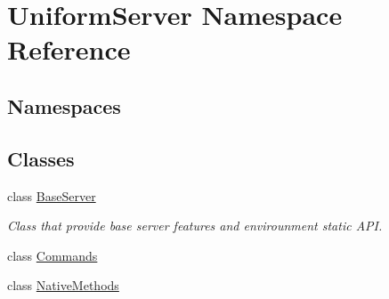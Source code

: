 \hypertarget{namespace_uniform_server}{}\section{Uniform\+Server Namespace Reference}
\label{namespace_uniform_server}
\subsection*{Namespaces}
\begin{DoxyCompactItemize}
\end{DoxyCompactItemize}
\subsection*{Classes}
\begin{DoxyCompactItemize}
\item 
class \mbox{\hyperlink{class_uniform_server_1_1_base_server}{Base\+Server}}
\begin{DoxyCompactList}\small\item\em Class that provide base server features and envirounment static A\+PI. \end{DoxyCompactList}\item 
class \mbox{\hyperlink{class_uniform_server_1_1_commands}{Commands}}
\item 
class \mbox{\hyperlink{class_uniform_server_1_1_native_methods}{Native\+Methods}}
\end{DoxyCompactItemize}
